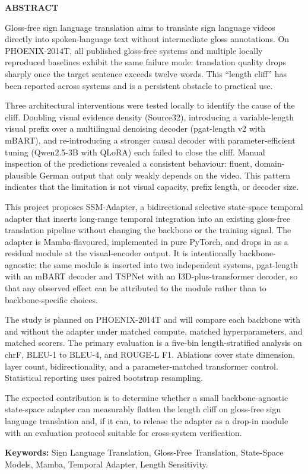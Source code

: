 {}

\begin{center}
    \large{\bf ABSTRACT}
\end{center}

Gloss-free sign language translation aims to translate sign language videos directly into spoken-language text without intermediate gloss annotations. On PHOENIX-2014T, all published gloss-free systems and multiple locally reproduced baselines exhibit the same failure mode: translation quality drops sharply once the target sentence exceeds twelve words. This ``length cliff'' has been reported across systems and is a persistent obstacle to practical use.

Three architectural interventions were tested locally to identify the cause of the cliff. Doubling visual evidence density (Source32), introducing a variable-length visual prefix over a multilingual denoising decoder (pgat-length v2 with mBART), and re-introducing a stronger causal decoder with parameter-efficient tuning (Qwen2.5-3B with QLoRA) each failed to close the cliff. Manual inspection of the predictions revealed a consistent behaviour: fluent, domain-plausible German output that only weakly depends on the video. This pattern indicates that the limitation is not visual capacity, prefix length, or decoder size.

This project proposes SSM-Adapter, a bidirectional selective state-space temporal adapter that inserts long-range temporal integration into an existing gloss-free translation pipeline without changing the backbone or the training signal. The adapter is Mamba-flavoured, implemented in pure PyTorch, and drops in as a residual module at the visual-encoder output. It is intentionally backbone-agnostic: the same module is inserted into two independent systems, pgat-length with an mBART decoder and TSPNet with an I3D-plus-transformer decoder, so that any observed effect can be attributed to the module rather than to backbone-specific choices.

The study is planned on PHOENIX-2014T and will compare each backbone with and without the adapter under matched compute, matched hyperparameters, and matched scorers. The primary evaluation is a five-bin length-stratified analysis on chrF, BLEU-1 to BLEU-4, and ROUGE-L F1. Ablations cover state dimension, layer count, bidirectionality, and a parameter-matched transformer control. Statistical reporting uses paired bootstrap resampling.

The expected contribution is to determine whether a small backbone-agnostic state-space adapter can measurably flatten the length cliff on gloss-free sign language translation and, if it can, to release the adapter as a drop-in module with an evaluation protocol suitable for cross-system verification.

\textbf{Keywords:} Sign Language Translation, Gloss-Free Translation, State-Space Models, Mamba, Temporal Adapter, Length Sensitivity.
